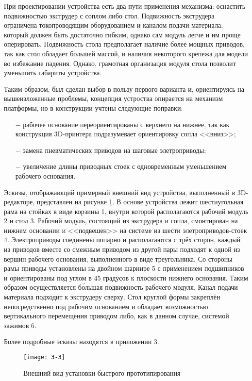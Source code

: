 При проектировании устройства есть два пути применения механизма: оснастить подвижностью экструдер с соплом либо стол. Подвижность экструдера ограничена токопроводящим оборудованием и каналом подачи материала, который должен быть достаточно гибким, однако сам модуль легче и им проще оперировать. Подвижность стола предполагает наличие более мощных приводов, так как стол обладает большей массой, и наличия некоторого крепежа для модели во избежание падения. Однако, грамотная организация модуля стола позволит уменьшить габариты устройства.

Таким образом, был сделан выбор в пользу первого варианта и, ориентируясь на вышеизложенные проблемы, концепция устроства опирается на механизм платформы, но в конструкции учтены следующие поправки:

\begin{itemize}
\item[$-$] рабочее основание переориентированы с верхнего на нижнее, так как конструкция 3D-принтера подразумевает ориентировку сопла <<вниз>>;
\item[$-$] замена пневматических приводов на шаговые элетроприводы;
\item[$-$] увеличение длины приводных стоек с одновременным уменьшением рабочего основания.
\end{itemize}

Эскизы, отображающий примерный внешний вид устройства, выполненный в 3D-редакторе, представлен на рисунке \ref{f:pic9}. В основе устройства лежит шестиугольная рама на стойках в виде корзины 1, внутри которой располагаются рабочий модуль 2 и стол 3. Рабочий модуль, состоящий из экструдера и сопла, смонтирован на нижнем основании и <<подвешен>> на системе из шести элетроприводов-стоек 4. Электроприводы соединены попарно и располагаются с трёх сторон, каждый из приводов вместе со смежным приводом из другой пары подходят к одной из вершин рабочего основания, выполненного в виде треугольника. Со стороны рамы приводы установлены на двойном шарнире 5 с применением подшипников и ориентированы под углом в 45 градусов к плоскости нижнего основания. Таким образом осуществляется б\'ольшая подвижность рабочего модуля. Канал подачи материала подходит к экструдеру сверху. Стол круглой формы закреплён непосредственно под рабочим основанием и обладает возможностью вертикального перемещения приводом либо, как в данном случае, системой зажимов 6.

Более подробные эскизы находятся в приложении 3.

\begin{figure} [h]
	\centering
	\texttt{[image: 3-3]}
	\caption{Внешний вид установки быстрого прототипирования}
	\label{f:pic9}
\end{figure}

